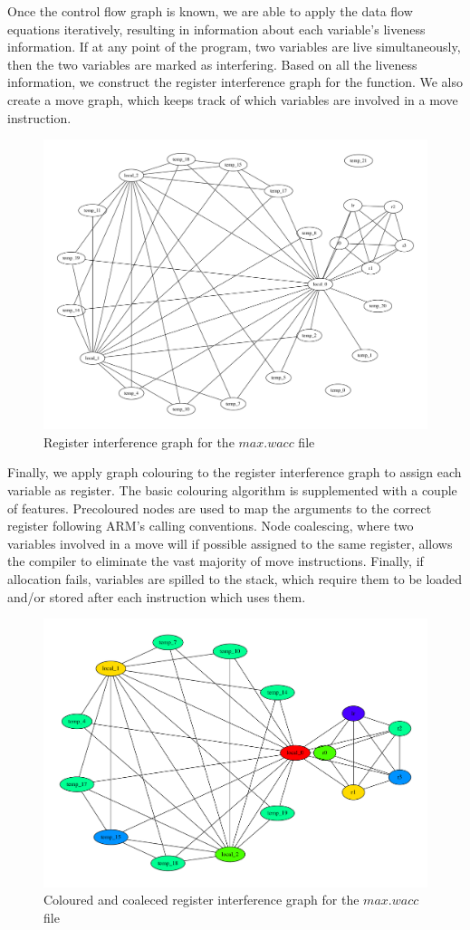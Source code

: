 \documentclass{article}
\begin{document}
Once the control flow graph is known, we are able to apply the data flow equations iteratively, resulting in information about each
variable's liveness information. If at any point of the program, two variables are live simultaneously, then the two variables are marked
as interfering. Based on all the liveness information, we construct the register interference graph for the function.
We also create a move graph, which keeps track of which variables are involved in a move instruction.

\begin{figure}
  \centering
  \includegraphics[width=.7\textwidth]{max-rig.pdf}
  \caption{Register interference graph for the $max.wacc$ file}
\end{figure}

Finally, we apply graph colouring to the register interference graph to assign each variable as register. The basic colouring algorithm
is supplemented with a couple of features. Precoloured nodes are used to map the arguments to the correct register following ARM's calling
conventions. Node coalescing, where two variables involved in a move will if possible assigned to the same register, allows the compiler
to eliminate the vast majority of move instructions. Finally, if allocation fails, variables are spilled to the stack, which require them
to be loaded and/or stored after each instruction which uses them.

\begin{figure}
  \centering
  \includegraphics[width=.7\textwidth]{max-colouring.pdf}
  \caption{Coloured and coaleced register interference graph for the $max.wacc$ file}
\end{figure}
\end{document}
